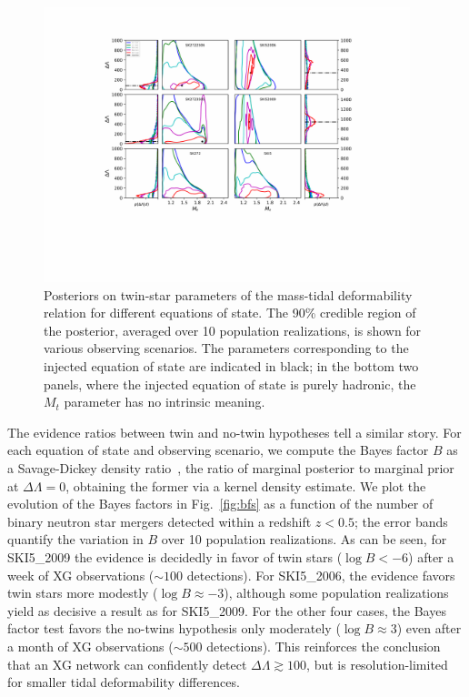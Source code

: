 \documentclass[aps,prd,twocolumn,superscriptaddress,nofootinbib]{revtex4-1}
\begin{document}
\begin{figure}[t]
    \centering
    \includegraphics[width=0.95\textwidth,trim={145 160 130 70},clip]{unif-moneyplot_SK-legend.pdf}
    \caption{Posteriors on twin-star parameters of the mass-tidal deformability relation for different equations of state. The 90\% credible region of the posterior, averaged over 10 population realizations, is shown for various observing scenarios. The parameters corresponding to the injected equation of state are indicated in black; in the bottom two panels, where the injected equation of state is purely hadronic, the $M_t$ parameter has no intrinsic meaning.}
    \label{fig:results}
\end{figure}

The evidence ratios between twin and no-twin hypotheses tell a similar story. For each equation of state and observing scenario, we compute the Bayes factor $B$ as a Savage-Dickey density ratio~\cite{Dickey1971}, the ratio of marginal posterior to marginal prior at $\Delta\Lambda = 0$, obtaining the former via a kernel density estimate. We plot the evolution of the Bayes factors in  Fig.~\ref{fig:bfs} as a function of the number of binary neutron star mergers detected within a redshift $z < 0.5$; the error bands quantify the variation in $B$ over 10 population realizations. As can be seen, for SKI5\_2009 the evidence is decidedly in favor of twin stars ($\log{B} < -6$) after a week of XG observations ($\sim 100$ detections). For SKI5\_2006, the evidence favors twin stars more modestly ($\log{B} \approx -3$), although some population realizations yield as decisive a result as for SKI5\_2009. For the other four cases, the Bayes factor test favors the no-twins hypothesis only moderately ($\log{B} \approx 3$) even after a month of XG observations ($\sim 500$ detections). This reinforces the conclusion that an XG network can confidently detect $\Delta\Lambda \gtrsim 100$, but is resolution-limited for smaller tidal deformability differences.
\end{document}
